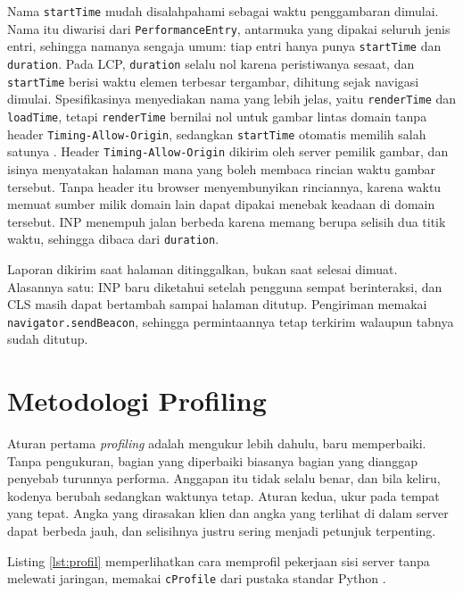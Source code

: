 Nama \texttt{startTime} mudah disalahpahami sebagai waktu penggambaran
dimulai. Nama itu diwarisi dari \texttt{PerformanceEntry}, antarmuka yang
dipakai seluruh jenis entri, sehingga namanya sengaja umum: tiap entri hanya
punya \texttt{startTime} dan \texttt{duration}. Pada LCP, \texttt{duration}
selalu nol karena peristiwanya sesaat, dan \texttt{startTime} berisi waktu
elemen terbesar tergambar, dihitung sejak navigasi dimulai. Spesifikasinya
menyediakan nama yang lebih jelas, yaitu \texttt{renderTime} dan
\texttt{loadTime}, tetapi \texttt{renderTime} bernilai nol untuk gambar lintas
domain tanpa header \texttt{Timing-Allow-Origin}, sedangkan \texttt{startTime}
otomatis memilih salah satunya \cite{w3c-lcp}. Header
\texttt{Timing-Allow-Origin} dikirim oleh server pemilik gambar, dan isinya
menyatakan halaman mana yang boleh membaca rincian waktu gambar tersebut.
Tanpa header itu browser menyembunyikan rinciannya, karena waktu memuat
sumber milik domain lain dapat dipakai menebak keadaan di domain tersebut.
INP menempuh jalan berbeda
karena memang berupa selisih dua titik waktu, sehingga dibaca dari
\texttt{duration}.

Laporan dikirim saat halaman ditinggalkan, bukan saat selesai dimuat. Alasannya
satu: INP baru diketahui setelah pengguna sempat berinteraksi, dan CLS masih
dapat bertambah sampai halaman ditutup. Pengiriman memakai
\texttt{navigator.sendBeacon}, sehingga permintaannya tetap terkirim walaupun
tabnya sudah ditutup.

\section{Metodologi Profiling}

Aturan pertama \textit{profiling} adalah mengukur lebih dahulu, baru
memperbaiki. Tanpa pengukuran, bagian yang diperbaiki biasanya bagian yang
dianggap penyebab turunnya performa. Anggapan itu tidak selalu benar, dan
bila keliru, kodenya berubah sedangkan waktunya tetap. Aturan kedua, ukur pada tempat yang
tepat. Angka yang dirasakan klien dan angka yang terlihat di dalam server
dapat berbeda jauh, dan selisihnya justru sering menjadi petunjuk terpenting.

Listing \ref{lst:profil} memperlihatkan cara memprofil pekerjaan sisi server
tanpa melewati jaringan, memakai \texttt{cProfile} dari pustaka standar
Python \cite{pythondocs-profile}.

